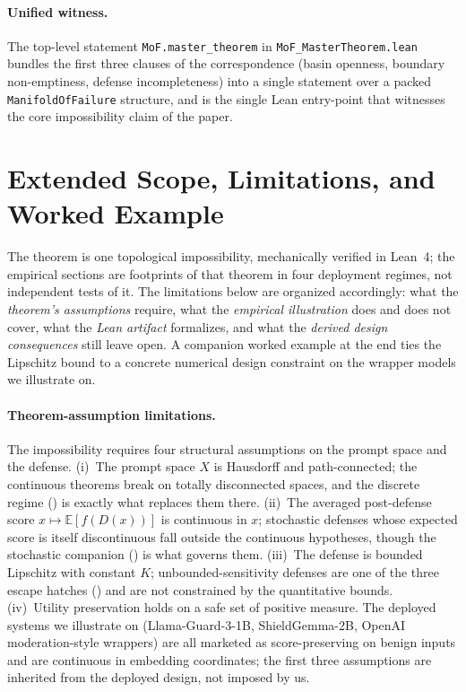 \documentclass[11pt]{article}
\begin{document}
\paragraph{Unified witness.}
The top-level statement \texttt{MoF.master\_theorem} in
\texttt{MoF\_MasterTheorem.lean} bundles the first three clauses of
the correspondence (basin openness, boundary non-emptiness, defense
incompleteness) into a single statement over a packed
\texttt{ManifoldOfFailure} structure, and is the single Lean
entry-point that witnesses the core impossibility claim of the
paper.

\section{Extended Scope, Limitations, and Worked Example}
\label{app:extended-limitations}

The theorem is one topological impossibility, mechanically verified
in Lean~4; the empirical sections are footprints of that theorem in
four deployment regimes, not independent tests of it. The limitations
below are organized accordingly: what the \emph{theorem's assumptions}
require, what the \emph{empirical illustration} does and does not
cover, what the \emph{Lean artifact} formalizes, and what the
\emph{derived design consequences} still leave open. A companion
worked example at the end ties the Lipschitz bound to a concrete
numerical design constraint on the wrapper models we illustrate on.

\paragraph{Theorem-assumption limitations.}
The impossibility requires four structural assumptions on the prompt
space and the defense. (i)~The prompt space $X$ is Hausdorff and
path-connected; the continuous theorems break on totally disconnected
spaces, and the discrete regime () is exactly
what replaces them there. (ii)~The averaged post-defense score
$x \mapsto \mathbb{E}[f(D(x))]$ is continuous in $x$; stochastic
defenses whose expected score is itself discontinuous fall outside
the continuous hypotheses, though the stochastic companion
() is what governs them. (iii)~The defense is
bounded Lipschitz with constant $K$; unbounded-sensitivity defenses
are one of the three escape hatches ()
and are not constrained by the quantitative bounds. (iv)~Utility
preservation holds on a safe set of positive measure. The deployed
systems we illustrate on (Llama-Guard-3-1B, ShieldGemma-2B, OpenAI
moderation-style wrappers) are all marketed as score-preserving on
benign inputs and are continuous in embedding coordinates; the first
three assumptions are inherited from the deployed design, not imposed
by us.
\end{document}
